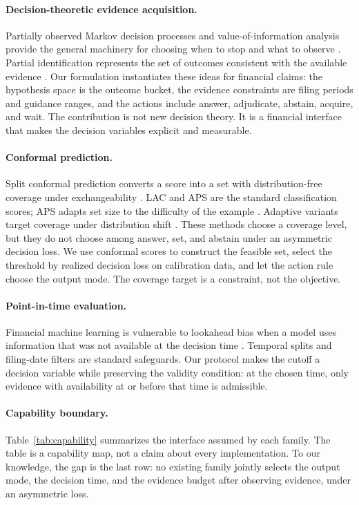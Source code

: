 \documentclass[11pt]{article}
\begin{document}
\paragraph{Decision-theoretic evidence acquisition.}
Partially observed Markov decision processes and value-of-information analysis provide the general machinery for choosing when to stop and what to observe \citep{krishnamurthy2017pomdp}. Partial identification represents the set of outcomes consistent with the available evidence \citep{manski2003partial}. Our formulation instantiates these ideas for financial claims: the hypothesis space is the outcome bucket, the evidence constraints are filing periods and guidance ranges, and the actions include answer, adjudicate, abstain, acquire, and wait. The contribution is not new decision theory. It is a financial interface that makes the decision variables explicit and measurable.

\paragraph{Conformal prediction.}
Split conformal prediction converts a score into a set with distribution-free coverage under exchangeability \citep{vovk2005algorithmic,angelopoulos2021gentle}. LAC and APS are the standard classification scores; APS adapts set size to the difficulty of the example \citep{romano2020classification}. Adaptive variants target coverage under distribution shift \citep{gibbs2021adaptive}. These methods choose a coverage level, but they do not choose among answer, set, and abstain under an asymmetric decision loss. We use conformal scores to construct the feasible set, select the threshold by realized decision loss on calibration data, and let the action rule choose the output mode. The coverage target is a constraint, not the objective.

\paragraph{Point-in-time evaluation.}
Financial machine learning is vulnerable to lookahead bias when a model uses information that was not available at the decision time \citep{lopezdeprado2018advances}. Temporal splits and filing-date filters are standard safeguards. Our protocol makes the cutoff a decision variable while preserving the validity condition: at the chosen time, only evidence with availability at or before that time is admissible.

\paragraph{Capability boundary.}
Table~\ref{tab:capability} summarizes the interface assumed by each family. The table is a capability map, not a claim about every implementation. To our knowledge, the gap is the last row: no existing family jointly selects the output mode, the decision time, and the evidence budget after observing evidence, under an asymmetric loss.
\end{document}
